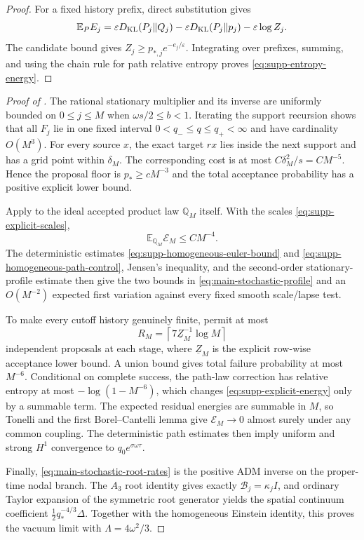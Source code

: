 \documentclass[11pt]{article}
\theoremstyle{definition}
\theoremstyle{remark}
\begin{document}
\begin{proof}
For a fixed history prefix, direct substitution gives
\[
 \mathbb E_P E_j
 =\varepsilon D_{\rm KL}(P_j\Vert Q_j)
 -\varepsilon D_{\rm KL}(P_j\Vert p_j)-\varepsilon\log Z_j.
\]
The candidate bound gives
$Z_j\ge p_{*,j}e^{-e_j/\varepsilon}$.  Integrating over prefixes, summing, and
using the chain rule for path relative entropy proves
\eqref{eq:supp-entropy-energy}.
\end{proof}

\begin{proof}[Proof of ]
The rational stationary multiplier and its inverse are uniformly bounded on
$0\le j\le M$ when $\omega s/2\le b<1$.  Iterating the support recursion shows
that all $F_j$ lie in one fixed interval $0<q_-\le q\le q_+<\infty$ and have
cardinality $O(M^3)$.  For every source $x$, the exact target $rx$ lies inside
the next support and has a grid point within $\delta_M$.  The corresponding
cost is at most
$C\delta_M^2/s=CM^{-5}$.  Hence the proposal floor is $p_*\ge cM^{-3}$ and the
total acceptance probability has a positive explicit lower bound.

Apply  to the ideal accepted product law
$\mathbb Q_M$ itself.  With the scales
\eqref{eq:supp-explicit-scales},
\begin{equation}
 \mathbb E_{\mathbb Q_M}\mathcal E_M\le CM^{-4}.
 \label{eq:supp-explicit-energy}
\end{equation}
The deterministic estimates
\eqref{eq:supp-homogeneous-euler-bound} and
\eqref{eq:supp-homogeneous-path-control}, Jensen's inequality, and the
second-order stationary-profile estimate then give the two bounds in
\eqref{eq:main-stochastic-profile} and an $O(M^{-2})$ expected first variation
against every fixed smooth scale/lapse test.

To make every cutoff history genuinely finite, permit at most
\[
 R_M=\left\lceil7\underline Z_M^{-1}\log M\right\rceil
\]
independent proposals at each stage, where $\underline Z_M$ is the explicit
row-wise acceptance lower bound.  A union bound gives total failure probability
at most $M^{-6}$.  Conditional on complete success, the path-law correction has
relative entropy at most $-\log(1-M^{-6})$, which changes
\eqref{eq:supp-explicit-energy} only by a summable term.  The expected residual
energies are summable in $M$, so Tonelli and the first Borel--Cantelli lemma give
$\mathcal E_M\to0$ almost surely under any common coupling.  The deterministic
path estimates then imply uniform and strong $H^1$ convergence to
$q_0e^{\sigma\omega\tau}$.

Finally, \eqref{eq:main-stochastic-root-rates} is the positive ADM inverse on
the proper-time nodal branch.  The $A_3$ root identity gives exactly
$\mathcal B_j=\kappa_jI$, and ordinary Taylor expansion of the symmetric root
generator yields the spatial continuum coefficient
$\tfrac12q_*^{-4/3}\Delta$.  Together with the homogeneous Einstein identity,
this proves the vacuum limit with $\Lambda=4\omega^2/3$.
\end{proof}
\end{document}
